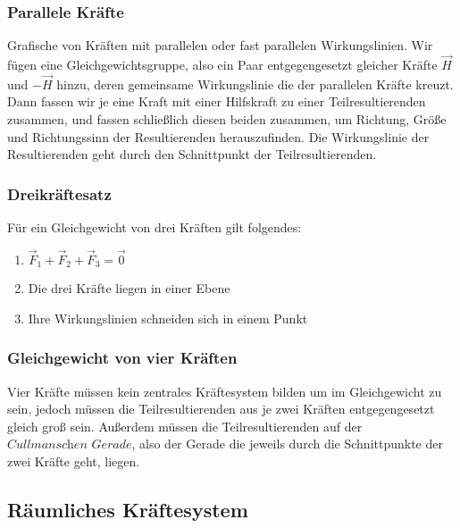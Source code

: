 \documentclass[a4paper,parskip=half*,DIV=7,fontsize=11pt]{scrartcl}
\begin{document}
	\subsubsection{Parallele Kräfte}
	Grafische von Kräften mit parallelen oder fast parallelen Wirkungslinien.
	Wir fügen eine Gleichgewichtsgruppe, also ein Paar entgegengesetzt gleicher Kräfte $\overrightarrow{H}$ und $-\overrightarrow{H}$ hinzu, deren gemeinsame Wirkungslinie die der parallelen Kräfte kreuzt.\\
	Dann fassen wir je eine Kraft mit einer Hilfskraft zu einer Teilresultierenden zusammen, und fassen schließlich diesen beiden zusammen, um Richtung, Größe und Richtungssinn der Resultierenden herauszufinden. Die Wirkungslinie der Resultierenden geht durch den Schnittpunkt der Teilresultierenden.
	
	\subsubsection{Dreikräftesatz}
	Für ein Gleichgewicht von drei Kräften gilt folgendes:
	\begin{enumerate}
		\item $\overrightarrow{F}_1+\overrightarrow{F}_2+\overrightarrow{F}_3=\overrightarrow{0}$
		\item Die drei Kräfte liegen in einer Ebene
		\item Ihre Wirkungslinien schneiden sich in einem Punkt
	\end{enumerate}
	
	\subsubsection{Gleichgewicht von vier Kräften}
	Vier Kräfte müssen kein zentrales Kräftesystem bilden um im Gleichgewicht zu sein, jedoch müssen die Teilresultierenden aus je zwei Kräften entgegengesetzt gleich groß sein. Außerdem müssen die Teilresultierenden auf der $\textit{Cullmanschen Gerade}$, also der Gerade die jeweils durch die Schnittpunkte der zwei Kräfte geht, liegen.
	
	\subsection{Räumliches Kräftesystem}
\end{document}
